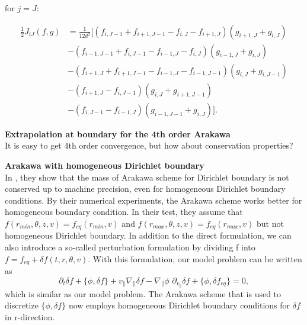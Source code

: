 for $j=J$:

\begin{equation}
\begin{aligned}
\frac{1}{2}J_{iJ} (f,g) &=\frac{1}{12d^2}[(f_{i,J-1}+f_{i+1,J-1}-f_{i,J}-f_{i+1,J})(g_{i+1,J}+g_{i,J})\\
&-(f_{i-1,J-1}+f_{i,J-1}-f_{i-1,J}-f_{i,J})(g_{i-1,J}+g_{i,J})\\
&-(f_{i+1,J}+f_{i+1,J-1}-f_{i-1,J}-f_{i-1,J-1})(g_{i,J}+g_{i,J-1})\\
&-(f_{i+1,J}-f_{i,J-1})(g_{i,J}+g_{i+1,J-1})\\
&-(f_{i,J-1}-f_{i-1,J})(g_{i-1,J-1}+g_{i,J})].
\end{aligned}
\end{equation}

\textbf{Extrapolation at boundary for the 4th order Arakawa}\\
It is easy to get 4th order convergence, but how about conservation properties?

\textbf{Arakawa with homogeneous Dirichlet boundary}\\
In \cite{crouseilles2018exponential}, they show that the mass of Arakawa scheme for Dirichlet boundary is not conserved up to machine precision, even for homogeneous Dirichlet boundary conditions. By their numerical experiments, the Arakawa scheme works better for homogeneous boundary condition. In their test, they assume that $f(r_{min}, \theta,z,v)=f_{eq}(r_{min},v)$ and $f(r_{max}, \theta,z,v)=f_{eq}(r_{max},v)$ but not homogeneous Dirichlet boundary. In addition to the direct formulation, we can also introduce a so-called perturbation formulation by dividing f into $f=f_{eq}+\delta f(t,r,\theta,v)$. With this formulation, our model problem can be written as 
\begin{equation}
 \partial_t \delta f + \{\phi, \delta f \} + v_\parallel \nabla_\parallel \delta f - \nabla_\parallel \phi\,\, \partial_{v_\parallel} \delta f + \{\phi, \delta f_{eq} \}= 0,
\end{equation} 
which is similar as our model problem. The Arakawa scheme that is used to discretize $\{\phi, \delta f \}$ now employs homogeneous Dirichlet boundary conditions for $\delta f$ in r-direction.